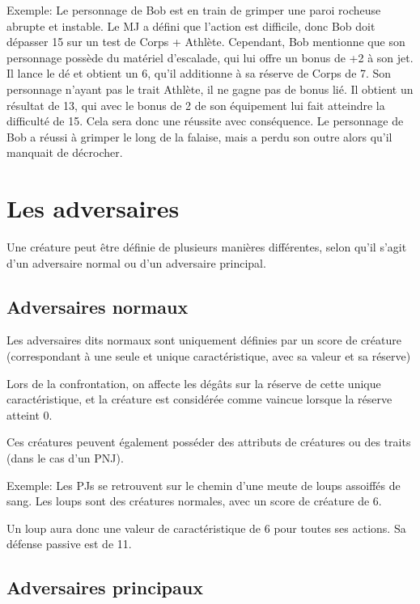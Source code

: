 \documentclass[a4paper,10pt,twoside,twocolumn,openany,bg=print]{dndbook}
\begin{document}
\begin{quotebox}
Exemple: Le personnage de Bob est en train de grimper une paroi rocheuse abrupte et instable. Le MJ a défini que l'action est difficile, donc Bob doit dépasser 15 sur un test de Corps + Athlète. Cependant, Bob mentionne que son personnage possède du matériel d'escalade, qui lui offre un bonus de +2 à son jet. Il lance le dé et obtient un 6, qu'il additionne à sa réserve de Corps de 7. Son personnage n'ayant pas le trait Athlète, il ne gagne pas de bonus lié. Il obtient un résultat de 13, qui avec le bonus de 2 de son équipement lui fait atteindre la difficulté de 15. Cela sera donc une réussite avec conséquence. Le personnage de Bob a réussi à grimper le long de la falaise, mais a perdu son outre alors qu'il manquait de décrocher.
\end{quotebox}

\section{Les adversaires}

Une créature peut être définie de plusieurs manières différentes, selon qu'il s'agit d'un adversaire normal ou d'un adversaire principal.

\subsection{Adversaires normaux}

Les adversaires dits normaux sont uniquement définies par un score de créature (correspondant à une seule et unique caractéristique, avec sa valeur et sa réserve)

Lors de la confrontation, on affecte les dégâts sur la réserve de cette unique caractéristique, et la créature est considérée comme vaincue lorsque la réserve atteint 0.

Ces créatures peuvent également posséder des attributs de créatures ou des traits (dans le cas d'un PNJ).

\begin{quotebox}
Exemple: Les PJs se retrouvent sur le chemin d'une meute de loups assoiffés de sang. Les loups sont des créatures normales, avec un score de créature de 6.

Un loup aura donc une valeur de caractéristique de 6 pour toutes ses actions. Sa défense passive est de 11.
\end{quotebox}

\subsection{Adversaires principaux}
\end{document}
